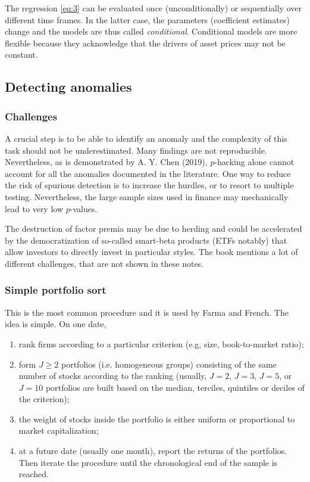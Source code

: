 The regression \eqref{eq:3} can be evaluated once (unconditionally) or sequentially over different time frames. In the latter case, the parameters (coefficient estimates) change and the models are thus called \textit{conditional}. Conditional models are more flexible because they acknowledge that the drivers of asset prices may not be constant.

\subsection{Detecting anomalies}

\subsubsection{Challenges}
A crucial step is to be able to identify an anomaly and the complexity of this task should not be underestimated. Many findings are not reproducible. Nevertheless, as is demonstrated by A. Y. Chen (2019), $p$-hacking alone cannot account for all the anomalies documented in the literature. One way to reduce the risk of spurious detection is to increase the hurdles, or to resort to multiple testing. Nevertheless, the large sample sizes used in finance may mechanically lead to very low $p$-values.

The destruction of factor premia may be due to herding and could be accelerated by the democratization of so-called smart-beta products (ETFs notably) that allow investors to directly invest in particular styles. The book mentions a lot of different challenges, that are not shown in these notes. 

\subsubsection{Simple portfolio sort}
This is the most common procedure and it is used by Farma and French. The idea is simple. On one date, 
\begin{enumerate}
    \item rank firms according to a particular criterion (e.g, size, book-to-market ratio);
    \item form $J \geq 2$ portfolios (i.e. homogeneous groups) consisting of the same number of stocks according to the ranking (usually, $J=2$, $J=3$, $J=5$, or $J=10$ portfolios are built based on the median, terciles, quintiles or deciles of the criterion);
    \item the weight of stocks inside the portfolio is either uniform or proportional to market capitalization;
    \item at a future date (usually one month), report the returns of the portfolios. Then iterate the procedure until the chronological end of the sample is reached. 
\end{enumerate}

